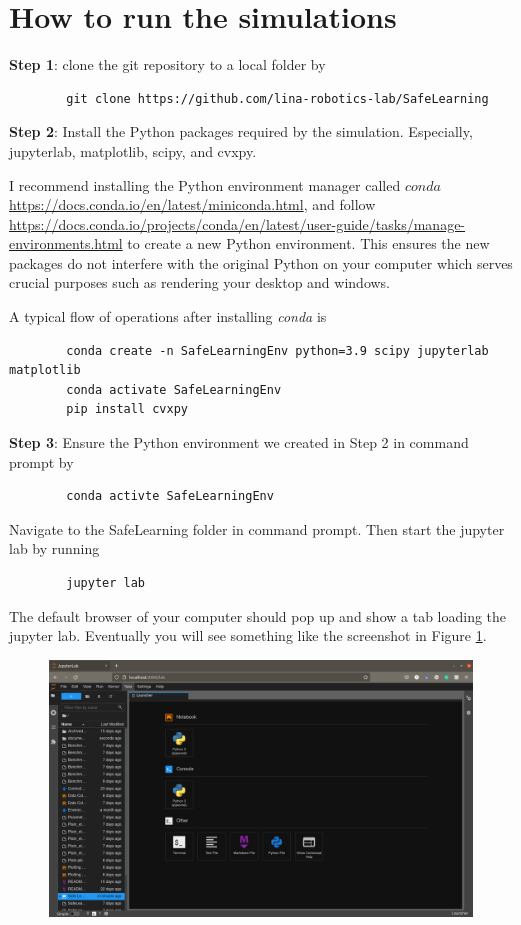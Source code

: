 \documentclass{article}
\theoremstyle{definition}
\theoremstyle{remark}
\begin{document}
	\section{How to run the simulations}\label{sec:howto}

	\textbf{Step 1}: clone the git repository to a local folder by 
	\begin{verbatim}
		git clone https://github.com/lina-robotics-lab/SafeLearning
	\end{verbatim}

	\textbf{Step 2}: Install the Python packages required by the simulation. 
	Especially, jupyterlab, matplotlib, scipy, and cvxpy.
	
	I recommend installing the Python environment manager called $conda$ \url{https://docs.conda.io/en/latest/miniconda.html}, and follow \url{https://docs.conda.io/projects/conda/en/latest/user-guide/tasks/manage-environments.html} to create a new Python environment. This ensures the new packages do not interfere with the original Python on your computer which serves crucial purposes such as rendering your desktop and windows.
	
	A typical flow of operations after installing \textit{conda} is
	\begin{verbatim}
		conda create -n SafeLearningEnv python=3.9 scipy jupyterlab matplotlib
		conda activate SafeLearningEnv 
		pip install cvxpy
	\end{verbatim}
	
	\textbf{Step 3}: Ensure the Python environment we created in Step 2 in command prompt by 
	\begin{verbatim}
		conda activte SafeLearningEnv
	\end{verbatim}
	Navigate to the SafeLearning folder in command prompt. Then start the jupyter lab by running
	\begin{verbatim}
		jupyter lab
	\end{verbatim}
	The default browser of your computer should pop up and show a tab loading the jupyter lab. Eventually you will see something like the screenshot in Figure \ref{fig:jupyter}.
	\begin{figure}[h]
		\centering
		\includegraphics[width=0.8\linewidth]{jupyter}
		\caption{}
		\label{fig:jupyter}
	\end{figure}
	
\end{document}
